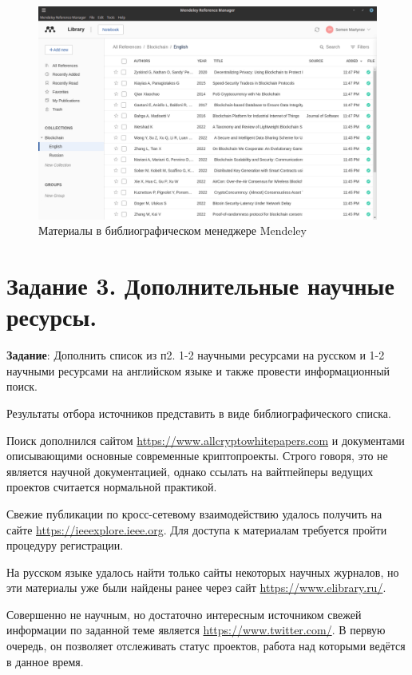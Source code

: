 \documentclass[a4paper, 12pt]{report}		%
\begin{document}
\begin{figure}[H]
 \centering
 \includegraphics[scale=0.4]{res/Mendeley}
 \caption{Материалы в библиографическом менеджере Mendeley}
\end{figure}

\chapter*{Задание 3. Дополнительные научные ресурсы.}

\textbf{Задание}: Дополнить список из п2. 1-2 научными ресурсами на русском и 1-2 научными ресурсами на английском языке и также провести информационный поиск.

Результаты отбора источников представить в виде библиографического списка.

\vspace{1.5cm}

Поиск дополнился сайтом \url{https://www.allcryptowhitepapers.com} и документами описывающими основные современные криптопроекты. Строго говоря, это не является научной документацией, однако ссылать на вайтпейперы ведущих проектов считается нормальной практикой.

Свежие публикации по кросс-сетевому взаимодействию удалось получить на сайте \url{https://ieeexplore.ieee.org}. Для доступа к материалам требуется пройти процедуру регистрации.

На русском языке удалось найти только сайты некоторых научных журналов, но эти материалы уже были найдены ранее через сайт \url{https://www.elibrary.ru/}.

Совершенно не научным, но достаточно интересным источником свежей информации по заданной теме является \url{https://www.twitter.com/}. В первую очередь, он позволяет отслеживать статус проектов, работа над которыми ведётся в данное время.
\end{document}
